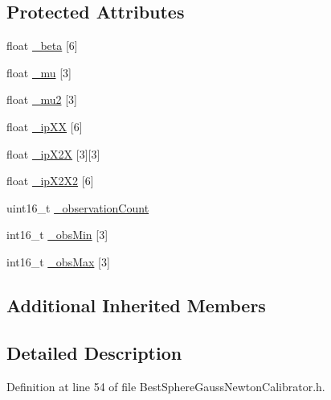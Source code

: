 \subsection*{Protected Attributes}
\begin{DoxyCompactItemize}
\item 
float \hyperlink{classflame_1_1_best_sphere_gauss_newton_calibrator_a1d98dcbd113f8e911fca9c2d11bbc3cf}{\-\_\-beta} \mbox{[}6\mbox{]}
\item 
float \hyperlink{classflame_1_1_best_sphere_gauss_newton_calibrator_aba6bfd9041955afc010372868ba0666e}{\-\_\-mu} \mbox{[}3\mbox{]}
\item 
float \hyperlink{classflame_1_1_best_sphere_gauss_newton_calibrator_a0fefa09292c75dbe4e4bd84c583abd4e}{\-\_\-mu2} \mbox{[}3\mbox{]}
\item 
float \hyperlink{classflame_1_1_best_sphere_gauss_newton_calibrator_a37f752e75712c8526e49192e1db0dc4a}{\-\_\-ip\-X\-X} \mbox{[}6\mbox{]}
\item 
float \hyperlink{classflame_1_1_best_sphere_gauss_newton_calibrator_a4fe0ab3079eba8062e36b8ecf7894632}{\-\_\-ip\-X2\-X} \mbox{[}3\mbox{]}\mbox{[}3\mbox{]}
\item 
float \hyperlink{classflame_1_1_best_sphere_gauss_newton_calibrator_a32f84ef767c6186082fff10955775e11}{\-\_\-ip\-X2\-X2} \mbox{[}6\mbox{]}
\item 
uint16\-\_\-t \hyperlink{classflame_1_1_best_sphere_gauss_newton_calibrator_ababc262e831cf26e95a5cb1558d22801}{\-\_\-observation\-Count}
\item 
int16\-\_\-t \hyperlink{classflame_1_1_best_sphere_gauss_newton_calibrator_a557a44d2712689cd6724de99644d762a}{\-\_\-obs\-Min} \mbox{[}3\mbox{]}
\item 
int16\-\_\-t \hyperlink{classflame_1_1_best_sphere_gauss_newton_calibrator_afa7171d3e79537e87887b12601c6a3f3}{\-\_\-obs\-Max} \mbox{[}3\mbox{]}
\end{DoxyCompactItemize}
\subsection*{Additional Inherited Members}


\subsection{Detailed Description}


Definition at line 54 of file Best\-Sphere\-Gauss\-Newton\-Calibrator.\-h.



